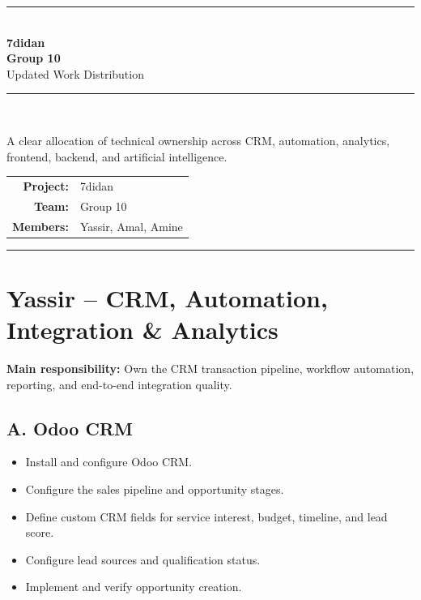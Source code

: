 \documentclass[11pt,a4paper]{article}
\begin{document}
\hypersetup{pageanchor=false}

\begin{titlepage}
  \thispagestyle{empty}
  \centering
  \vspace*{2.4cm}

  {\color{LeadBlue}\rule{\textwidth}{1.2pt}}\\[1.2cm]
  {\Huge\bfseries\color{LeadBlue} 7didan}\\[0.45cm]
  {\LARGE\bfseries Group 10}\\[0.35cm]
  {\Large Updated Work Distribution}\\[1.2cm]
  {\color{LeadTeal}\rule{0.72\textwidth}{2pt}}\\[1.4cm]

  \begin{minipage}{0.82\textwidth}
    \centering
    \large
    A clear allocation of technical ownership across CRM, automation,
    analytics, frontend, backend, and artificial intelligence.
  \end{minipage}

  \vfill

  \begin{tabular}{>{\bfseries}rl}
    Project: & 7didan \\
    Team: & Group 10 \\
    Members: & Yassir, Amal, Amine \\
  \end{tabular}

  \vspace{1.5cm}
  {\color{LeadBlue}\rule{\textwidth}{1.2pt}}
\end{titlepage}

\hypersetup{pageanchor=true}
\tableofcontents
\newpage
{}

\section{Yassir -- CRM, Automation, Integration \& Analytics}

\textbf{Main responsibility:} Own the CRM transaction pipeline, workflow automation, reporting, and end-to-end integration quality.

\subsection*{A. Odoo CRM}
\begin{itemize}
  \item Install and configure Odoo CRM.
  \item Configure the sales pipeline and opportunity stages.
  \item Define custom CRM fields for service interest, budget, timeline, and lead score.
  \item Configure lead sources and qualification status.
  \item Implement and verify opportunity creation.
\end{itemize}
\end{document}
